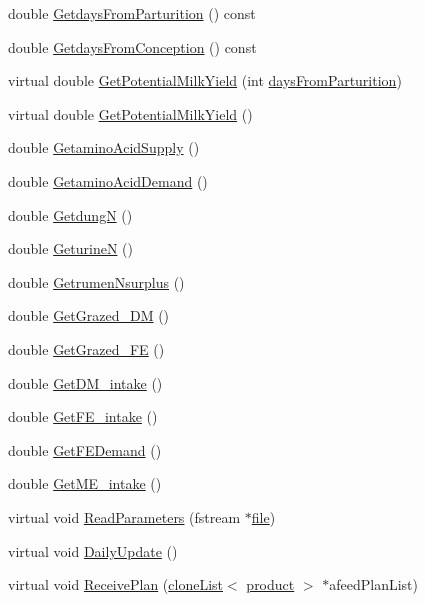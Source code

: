\begin{DoxyCompactItemize}
\item 
double \hyperlink{classcattle_af860df7afb8d4e32b24cd63ddd8db9a1}{GetdaysFromParturition} () const 
\item 
double \hyperlink{classcattle_add4227ea5e41412332ae7baa499cc54e}{GetdaysFromConception} () const 
\item 
virtual double \hyperlink{classcattle_ab885604f6912a5bfadc8a71d42e72328}{GetPotentialMilkYield} (int \hyperlink{classcattle_a6a51852f30326c7e77ac430c89033d0f}{daysFromParturition})
\item 
virtual double \hyperlink{classcattle_a325c1edad49aee895e01d87f0c44bf64}{GetPotentialMilkYield} ()
\item 
double \hyperlink{classcattle_a8b0fca6e07ddb7aadda529b88c1f1f8d}{GetaminoAcidSupply} ()
\item 
double \hyperlink{classcattle_af0ab4f6ff6d9da66b7f5cd3af963d769}{GetaminoAcidDemand} ()
\item 
double \hyperlink{classcattle_aec2bd44f7a6519163a4bc66a4616b0bf}{GetdungN} ()
\item 
double \hyperlink{classcattle_a5959426fa68c0093242785ddd0a928d2}{GeturineN} ()
\item 
double \hyperlink{classcattle_a025d988cdff86a92ff8bb87d8f918cd5}{GetrumenNsurplus} ()
\item 
double \hyperlink{classcattle_ad3bde990fd7b51e67af6ba7c202f6235}{GetGrazed\_\-DM} ()
\item 
double \hyperlink{classcattle_ad841e565dad1037d1ad59967d7d70600}{GetGrazed\_\-FE} ()
\item 
double \hyperlink{classcattle_a8c031732fac4876031f777b1222fb765}{GetDM\_\-intake} ()
\item 
double \hyperlink{classcattle_a808e0639e48ba92d545d83ca1fd21834}{GetFE\_\-intake} ()
\item 
double \hyperlink{classcattle_ae44a251b975bfb404a8c01bdccc1fb22}{GetFEDemand} ()
\item 
double \hyperlink{classcattle_ac5a17c14e1bbb07428588e7638eee47f}{GetME\_\-intake} ()
\item 
virtual void \hyperlink{classcattle_a13ca8c9803fc7d414933e0cacb5e398c}{ReadParameters} (fstream $\ast$\hyperlink{classbase_a3af52ee9891719d09b8b19b42450b6f6}{file})
\item 
virtual void \hyperlink{classcattle_a418e7ccadab4a1b2b71d5687c4f22373}{DailyUpdate} ()
\item 
virtual void \hyperlink{classcattle_abbfdc707ceb6778a0e335acdcf8e24d4}{ReceivePlan} (\hyperlink{classclone_list}{cloneList}$<$ \hyperlink{classproduct}{product} $>$ $\ast$afeedPlanList)

\end{DoxyCompactItemize}
